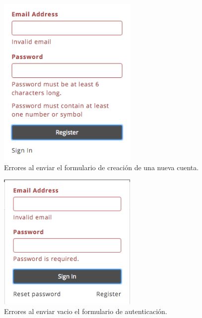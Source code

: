 
\begin{figure}[H]
	\centering
	\includegraphics[width=0.6\textwidth]{figuras/architecture/accounts/new/send_error.png}
	\caption{Errores al enviar el formulario de creación de una nueva cuenta.}
	\label{figure:architecture:accounts:new:send_error}
\end{figure}

\begin{figure}[H]
	\centering
	\includegraphics[width=0.6\textwidth]{figuras/architecture/accounts/signin/send_empty.png}
	\caption{Errores al enviar vacio el formulario de autenticación.}
	\label{figure:architecture:accounts:signin:send_empty}
\end{figure}